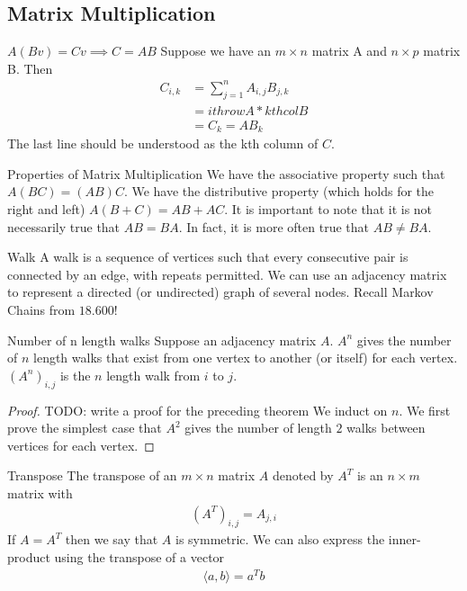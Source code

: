 \documentclass[11pt]{article}
\begin{document}
\subsection{Matrix Multiplication}
$A(Bv)=Cv \implies C=AB$
Suppose we have an $m \times n$ matrix A and $n \times p$ matrix B. Then
\begin{align*}
    C_{i,k} &= \sum_{j=1}^{n} A_{i,j}B_{j,k} \\
            &= ith row A* kth col B \\
            &= C_k = AB_k
\end{align*}
The last line should be understood as the kth column of $C$.
\begin{theorembox}{Properties of Matrix Multiplication}
    We have the associative property such that $A(BC)=(AB)C$. We have the distributive property (which holds for the right and left) $A(B+C)=AB+AC$. It is important to note that it is not necessarily true that $AB = BA$. In fact, it is more often true that $AB \neq BA$.
\end{theorembox}

\begin{definitionbox}{Walk}
    A walk is a sequence of vertices such that every consecutive pair is connected by an edge, with repeats permitted. We can use an adjacency matrix to represent a directed (or undirected) graph of several nodes. Recall Markov Chains from $18.600$!
\end{definitionbox}

\begin{theorembox}{Number of n length walks}
    Suppose an adjacency matrix $A$. $A^n$ gives the number of $n$ length walks that exist from one vertex to another (or itself) for each vertex. $(A^n)_{i,j}$ is the $n$ length walk from $i$ to $j$.
\end{theorembox}
\begin{proof}
    TODO: write a proof for the preceding theorem
    We induct on $n$. We first prove the simplest case that $A^2$ gives the number of length $2$ walks between vertices for each vertex.
\end{proof}

\begin{definitionbox}{Transpose}
    The transpose of an $m \times n$ matrix $A$ denoted by $A^T$ is an $n \times m$ matrix with
    \begin{align*}
        (A^T)_{i,j}=A_{j,i}
    \end{align*}
    If $A=A^T$ then we say that $A$ is symmetric. We can also express the inner-product using the
    transpose of a vector
    \begin{align*}
        \langle a,b \rangle = a^Tb
    \end{align*}
\end{definitionbox}
\end{document}
